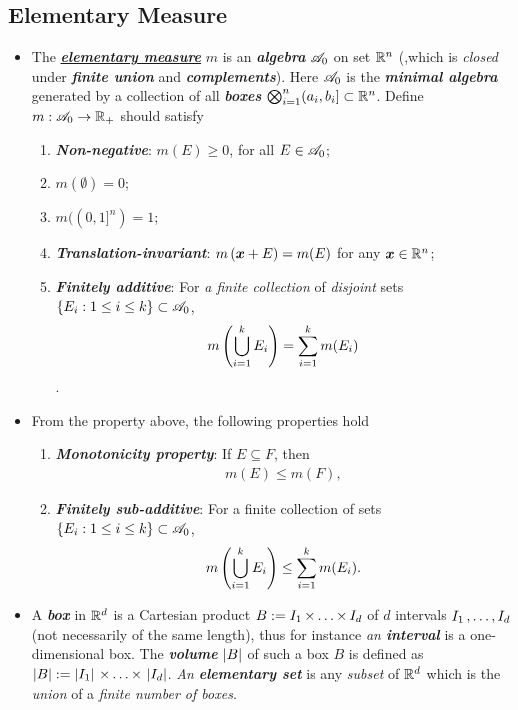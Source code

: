 \documentclass[11pt]{article}
\begin{document}
\subsection{Elementary Measure}
\begin{itemize}
\item \begin{definition} 
The \underline{\emph{\textbf{elementary measure}}} $m$ is an \emph{\textbf{algebra}} ${\mathscr A}_{0}$ on set ${\mathbb R}^{n}$ (,which is \emph{closed} under \emph{\textbf{finite union}} and \emph{\textbf{complements}}). Here ${\mathscr A}_{0}$ is the \emph{\textbf{minimal algebra}} generated by a collection of all \emph{\textbf{boxes}} $\bigotimes_{i=1}^{n}(a_{i},b_{i}] \subset {\mathbb R}^{n}$. Define $m: {\mathscr A}_{0} \rightarrow {\mathbb R}_{+}$ should satisfy
\begin{enumerate}
\item \emph{\textbf{Non-negative}}: $m(E) \ge 0$, for all $E\in {\mathscr A}_{0}$;
\item $m(\emptyset) = 0$;
\item $m((0,1]^{n})= 1$;
\item \emph{\textbf{Translation-invariant}}: $m\left(\boldsymbol{x}+ E\right) = m(E)$ for any $\boldsymbol{x}\in {\mathbb R}^{n}$; 
\item \emph{\textbf{Finitely additive}}: For \emph{a finite collection} of \emph{disjoint} sets $\left\{E_{i}: 1\le i\le k\right\} \subset {\mathscr A}_{0}$, 
$$ m\left(\bigcup_{i=1}^{k}E_{i}\right)= \sum_{i=1}^{k}m(E_{i})$$.
\end{enumerate}
\end{definition}

\item \begin{remark}
From the property above, the following properties hold
\begin{enumerate}
\item \textit{\textbf{Monotonicity property}}: If $E \subseteq F$, then 
\begin{align*}
m(E) \le m(F),
\end{align*}

\item \emph{\textbf{Finitely sub-additive}}: For a finite collection of sets $\left\{E_{i}: 1\le i\le k\right\} \subset {\mathscr A}_{0}$, 
$$ m\left(\bigcup_{i=1}^{k}E_{i}\right) \le  \sum_{i=1}^{k}m(E_{i}).$$
\end{enumerate}
\end{remark}

\item \begin{remark}
A \emph{\textbf{box}} in ${\mathbb R}^d$ is a Cartesian product $B := I_1 \,{\times}\ldots{\times}\, I_d$ of $d$ intervals $I_1 \,{,}\ldots{,}\, I_d$ (not necessarily of the same length), thus for instance \emph{an \textbf{interval}} is a one-dimensional box. The \emph{\textbf{volume}} $\left\lvert B \right\rvert$ of such a box $B$ is defined as $\left\lvert B \right\rvert := \left\lvert I_1 \right\rvert \,{\times}\ldots{\times}\,  \left\lvert I_d \right\rvert$. \emph{An \textbf{elementary set}} is any \emph{subset} of ${\mathbb R}^d$ which is the \emph{union} of a\emph{ finite number of boxes}.
\end{remark}


\end{itemize}
\end{document}

